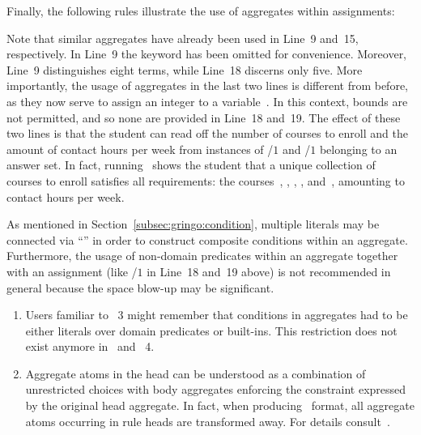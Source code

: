 \begin{example}
Finally, the following rules illustrate the use of aggregates within assignments:
%

%
Note that similar aggregates have already been used in Line~9 and~15, respectively.
In Line~9 the keyword  has been omitted for convenience.
Moreover, Line~9 distinguishes eight terms, while Line~18 discerns only five.
More importantly, the usage of aggregates in the last two lines is different from before,
as they now serve to assign an integer to a variable~.
In this context, bounds are not permitted, and so none are provided in Line~18 and~19.
The effect of these two lines is that the student can read off the number of
courses to enroll and the amount of contact hours per week from instances of
/$1$ and /$1$ belonging to an answer set.%
%
In fact, running \clasp\ shows the student that a unique
collection of~ courses to enroll satisfies all requirements:
the courses~, , , , and~,
amounting to~ contact hours per week.

As mentioned in Section~\ref{subsec:gringo:condition},
multiple literals may be connected via ``\code{,}'' in order to construct
composite conditions within an aggregate.
Furthermore, the usage of non-domain predicates within an aggregate
together with an assignment (like /$1$ in Line~18 and~19 above)
is not recommended in general because the space blow-up may be significant.
\eexample
\end{example}

\begin{note}
\begin{enumerate}
\item 
  Users familiar to \gringo~3 might remember that conditions in aggregates 
  had to be either literals over domain predicates or built-ins.
  This restriction does not exist anymore in \gringo\ and \clingo~4.
\item 
  Aggregate atoms in the head can be understood as a combination of unrestricted choices with body aggregates enforcing the constraint expressed by the
  original head aggregate.
  In fact, when producing \smodels\ format, all aggregate atoms occurring in rule heads are transformed away.
  For details consult~\cite{siniso02a,gekakasc12a}.
\end{enumerate}
\end{note}

